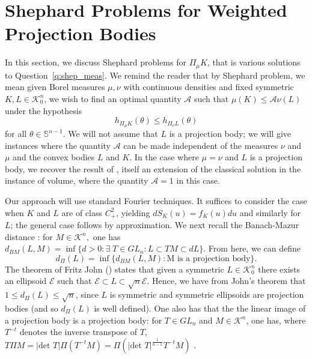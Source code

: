 \documentclass[11pt]{amsart}
\theoremstyle{definition}
\theoremstyle{remark}
\numberwithin{equation}{section}
\newcommand{\s}{\mathbb{S}}
\newcommand{\conbod}{\mathcal{K}^n}
\begin{document}
\section{Shephard Problems for Weighted Projection Bodies}
\label{s:shep_meas}
In this section, we discuss Shephard problems for $\Pi_\mu K$, that is various solutions to Question~\ref{q:shep_meas}. We remind the reader that by Shephard problem, we mean given Borel measures $\mu,\nu$ with continuous densities and fixed symmetric $K,L\in\conbod_0$, we wish to find an optimal quantity $\mathcal{A}$ such that $\mu(K)\leq\mathcal{A}\nu(L)$ under the hypothesis
$$h_{\Pi_{\mu} K}(\theta)\leq h_{\Pi_{\nu} L}(\theta)$$ for all $\theta\in\s^{n-1}.$ We will not assume that $L$ is a projection body; we will give instances where the quantity $\mathcal{A}$ can be made independent of the measures $\nu$ and $\mu$ and the convex bodies $L$ and $K$. In the case where $\mu=\nu$ and $L$ is a projection body, we recover the result of \cite{GAL19}, itself an extension of the classical solution in the instance of volume, where the quantity $\mathcal{A}=1$ in this case.

Our approach will use standard Fourier techniques. It suffices to consider the case when $K$ and $L$ are of class $C^2_+$, yielding $dS_K(u)=f_K(u)du$ and similarly for $L$; the general case follows by approximation. We next recall the Banach-Mazur distance \cite{AGA}: for $M\in\conbod,$ one has
$d_{BM}(L,M)=\inf\{d>0: \exists \; T\in GL_{n} : L\subset TM \subset dL\}$. From here, we can define
$$d_{\Pi}(L)=\inf\{d_{BM}(L,M):\text{M is a projection body}\}.$$
The theorem of Fritz John (\cite{AGA, gardner_book}) states that given a symmetric $L\in\conbod_0$ there exists an ellipsoid $\mathcal{E}$ such that $\mathcal{E}\subset L \subset \sqrt{n}\mathcal{E}$. Hence, we have from John's theorem that $1\leq d_{\Pi}(L)\leq \sqrt{n}$, since $L$ is symmetric and symmetric ellipsoids are projection bodies (and so $d_{\Pi}(L)$ is well defined). One also has that the the linear image of a projection body is a projection body: for $T\in GL_{n}$ and $M\in\conbod$, one has, where $T^{-t}$ denotes the inverse transpose of $T$,
$T\Pi M = |\text{det } T|\Pi(T^{-t} M)=\Pi(|\text{det } T|^{\frac{1}{n-1}}T^{-t} M)$ \cite{gardner_book,LRZ22}.
\end{document}
